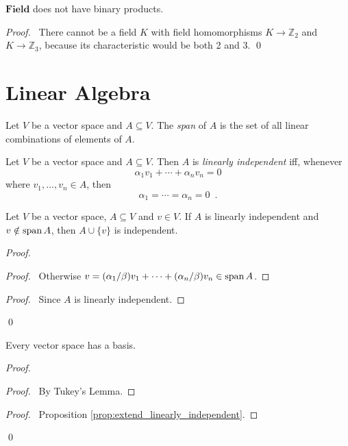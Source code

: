 \begin{prop}
$\mathbf{Field}$ does not have binary products.
\end{prop}

\begin{proof}
\pf\ There cannot be a field $K$ with field homomorphisms $K \rightarrow \mathbb{Z}_2$ and $K \rightarrow \mathbb{Z}_3$, because its characteristic would be both 2 and 3. \qed
\end{proof}

\chapter{Linear Algebra}

\begin{df}[Span]
Let $V$ be a vector space and $A \subseteq V$. The \emph{span} of $A$ is the set of all linear combinations of elements of $A$.
\end{df}

\begin{df}[Independent]
Let $V$ be a vector space and $A \subseteq V$. Then $A$ is \emph{linearly independent} iff, whenever
\[ \alpha_1 v_1 + \cdots + \alpha_n v_n = 0 \]
where $v_1, \ldots, v_n \in A$, then
\[ \alpha_1 = \cdots = \alpha_n = 0 \enspace . \]
\end{df}

\begin{prop}
\label{prop:extend_linearly_independent}
Let $V$ be a vector space, $A \subseteq V$ and $v \in V$. If $A$ is linearly independent and $v \notin \operatorname{span} A$, then $A \cup \{ v \}$ is independent.
\end{prop}

\begin{proof}
\pf
{}
\begin{proof}
	\pf\ Otherwise $v = (\alpha_1 / \beta) v_1 + \cdots + (\alpha_n / \beta) v_n \in \operatorname{span} A$.
\end{proof}
\begin{proof}
	\pf\ Since $A$ is linearly independent.
\end{proof}
\qed
\end{proof}

\begin{thm}
Every vector space has a basis.
\end{thm}

\begin{proof}
\pf
{}
\begin{proof}
	\pf\ By Tukey's Lemma.
\end{proof}
\begin{proof}
	\pf\ Proposition \ref{prop:extend_linearly_independent}.
\end{proof}
\qed
\end{proof}


